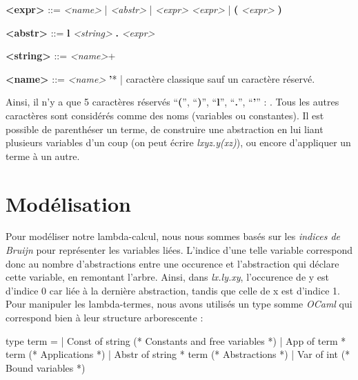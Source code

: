 \documentclass[11pt,a4paper]{report}
\begin{document}
\textbf{<expr>}  ::=  \textit{<name>}
           | \textit{<abstr>}
           | \textit{<expr> <expr>}
           | \textbf{(} \textit{<expr>} \textbf{)}

\textbf{<abstr>}  ::= \textbf{l} \textit{<string>} \textbf{.} \textit{<expr>}

\textbf{<string>}  ::= \textit{<name>}+

\textbf{<name>}  ::=  \textit{<name>} \textbf{'}*
           | caractère classique sauf un caractère réservé.

\medskip

Ainsi, il n'y a que 5 caractères réservés ``\textbf{(}'', ``\textbf{)}'', ``\textbf{l}'', ``\textbf{.}'', ``\textbf{'}'' : . Tous les autres caractères sont considérés comme des noms (variables ou constantes). Il est possible de parenthéser un terme, de construire une abstraction en lui liant plusieurs variables d'un coup (on peut écrire \textit{lxyz.y(xz)}), ou encore d'appliquer un terme à un autre.

\section{Modélisation}
\bigskip
Pour modéliser notre lambda-calcul, nous nous sommes basés sur les \emph{indices de Bruijn} pour représenter les variables liées. L'indice d'une telle variable correspond donc au nombre d'abstractions entre une occurence et l'abstraction qui déclare cette variable, en remontant l'arbre. Ainsi, dans \textit{lx.ly.xy}, l'occurence de y est d'indice 0 car liée à la dernière abstraction, tandis que celle de x est d'indice 1. Pour manipuler les lambda-termes, nous avons utilisés un type somme \textit{OCaml} qui correspond bien à leur structure arborescente :

\begin{OCaml}

type term =
| Const of string         (* Constants and free variables *)
| App of term * term      (* Applications *)  
| Abstr of string * term  (* Abstractions *)
| Var of int              (* Bound variables *)

\end{OCaml}
\end{document}

